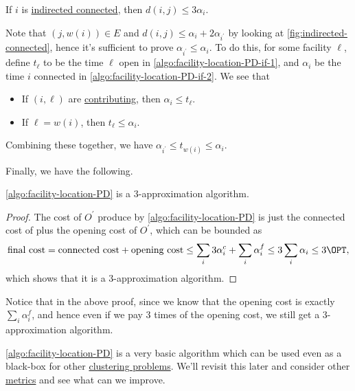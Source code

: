 \begin{claim}
	If \(i\) is \hyperref[not:indirected-connected]{indirected connected}, then \(d(i, j) \leq 3 \alpha _i\).
\end{claim}
\begin{explanation}
	Note that \((j, w(i))\in E\) and \(d(i, j) \leq \alpha _i + 2\alpha _{i^\prime }\) by looking at \autoref{fig:indirected-connected}, hence it's sufficient to prove \(\alpha _{i^\prime } \leq \alpha _i\). To do this, for some facility \(\ell \), define \(t_{\ell}\) to be the time \(\ell \) open in \autoref{algo:facility-location-PD-if-1}, and \(\alpha _i\) be the time \(i\) connected in \autoref{algo:facility-location-PD-if-2}. We see that
	\begin{itemize}
		\item If \((i, \ell )\) are \hyperref[not:contributing]{contributing}, then \(\alpha _i \leq t_{\ell } \).
		\item If \(\ell =w(i)\), then \(t_{\ell } \leq \alpha _i\).
	\end{itemize}
	Combining these together, we have \(\alpha _{i ^\prime} \leq t_{w(i)} \leq \alpha _i\).
\end{explanation}

Finally, we have the following.
\begin{theorem}\label{thm:lec5}
	\autoref{algo:facility-location-PD} is a \(3\)-approximation algorithm.
\end{theorem}
\begin{proof}
	The cost of \(O^\prime \) produce by \autoref{algo:facility-location-PD} is just the connected cost of plus the opening cost of \(O^\prime \), which can be bounded as
	\[
		\text{final cost} = \text{connected cost} + \text{opening cost} \leq \sum _i 3 \alpha _i^c + \sum_i \alpha _i^f \leq 3 \sum_{i} \alpha _i \leq 3 \OPT,
	\]
	which shows that it is a \(3\)-approximation algorithm.
\end{proof}

\begin{note}
	Notice that in the above proof, since we know that the opening cost is exactly \(\sum_{i} \alpha _i^f\), and hence even if we pay \(3\) times of the opening cost, we still get a \(3\)-approximation algorithm.
\end{note}

\begin{remark}
	\autoref{algo:facility-location-PD} is a very basic algorithm which can be used even as a black-box for other \hyperref[prb:clustering]{clustering problems}. We'll revisit this later and consider other \hyperref[def:metric]{metrics} and see what can we improve.
\end{remark}